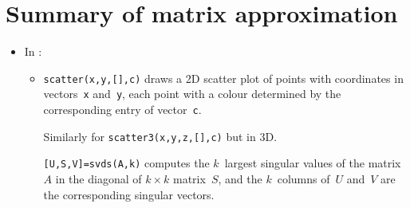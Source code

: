 
\section{Summary of matrix approximation}
\label{sec:summa}

\begin{itemize}
\def\index#1{}%


\subsubsection*{Measure changes to matrices}

\itemhi \cref{pro:ai} approximates matrices.
For an image stored as scalars in an \(m\times n\) matrix~\(A\).
\begin{enumerate}
\item Compute an \svd\ \(A=\usv\) with \verb|[U,S,V]=svd(A)|.
\item Choose a desired ~\(k\) based upon the s (\cref{thm:am}); typically there are \(k\)~`large' s and the rest are `small'.
\item Then the `best' rank~\(k\) approximation to the image matrix~\(A\) is
\begin{eqnarray*}
A_k&:=&\sigma_1\uv_1\tr\vv_1+\sigma_2\uv_2\tr\vv_2+\cdots+\sigma_k\uv_k\tr\vv_k
\\&=&\verb|U(:,1:k)*S(1:k,1:k)*V(:,1:k)'|
\end{eqnarray*}
\end{enumerate}


\item In \script:
\begin{itemize}
\itemme \index{norm()@\texttt{norm()}}\verb|norm(A)| computes the , \cref{def:norm}, namely the largest  of the matrix~\(A\).
Also, \verb|norm(v)| for vector~\verb|v| computes the , or , \(\sqrt{v_1^2+v_2^2+\cdots+v_n^2}\).

\item \index{scatter()@\texttt{scatter()}}\verb|scatter(x,y,[],c)| draws a 2D scatter plot of points with coordinates in vectors~\verb|x| and~\verb|y|, each point with a colour determined by the corresponding entry of vector~\verb|c|.  

Similarly for \index{scatter3()@\texttt{scatter3()}}\verb|scatter3(x,y,z,[],c)| but in 3D.

\itemme \index{svds()@\texttt{svds()}}\verb|[U,S,V]=svds(A,k)| computes the \(k\)~largest singular values of the matrix~\(A\) in the diagonal of \(k\times k\) matrix~\(S\), and the  \(k\)~columns of~\(U\) and~\(V\) are the corresponding singular vectors.


\end{itemize}
\end{itemize}
